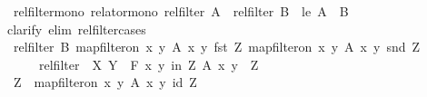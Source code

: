 \begin{isabellebody}
\isanewline
{}\isamarkupfalse%
%
\endisatagproof
{\isafoldproof}%
%
\isadelimproof
\isanewline
%
\endisadelimproof
\isanewline
{}\isamarkupfalse%
\ rel{\isacharunderscore}{\kern0pt}filter{\isacharunderscore}{\kern0pt}mono\ {\isacharbrackleft}{\kern0pt}relator{\isacharunderscore}{\kern0pt}mono{\isacharbrackright}{\kern0pt}{\isacharcolon}{\kern0pt}\ {\isachardoublequoteopen}rel{\isacharunderscore}{\kern0pt}filter\ A\ {\isasymle}\ rel{\isacharunderscore}{\kern0pt}filter\ B{\isachardoublequoteclose}\ \ le{\isacharcolon}{\kern0pt}\ {\isachardoublequoteopen}A\ {\isasymle}\ B{\isachardoublequoteclose}\isanewline
%
\isadelimproof
%
\endisadelimproof
%
\isatagproof
{}\isamarkupfalse%
{\isacharparenleft}{\kern0pt}clarify\ elim{\isacharbang}{\kern0pt}{\isacharcolon}{\kern0pt}\ rel{\isacharunderscore}{\kern0pt}filter{\isachardot}{\kern0pt}cases{\isacharparenright}{\kern0pt}\isanewline
\ \ \isamarkupfalse%
\ {\isachardoublequoteopen}rel{\isacharunderscore}{\kern0pt}filter\ B\ {\isacharparenleft}{\kern0pt}map{\isacharunderscore}{\kern0pt}filter{\isacharunderscore}{\kern0pt}on\ {\isacharbraceleft}{\kern0pt}{\isacharparenleft}{\kern0pt}x{\isacharcomma}{\kern0pt}\ y{\isacharparenright}{\kern0pt}{\isachardot}{\kern0pt}\ A\ x\ y{\isacharbraceright}{\kern0pt}\ fst\ Z{\isacharparenright}{\kern0pt}\ {\isacharparenleft}{\kern0pt}map{\isacharunderscore}{\kern0pt}filter{\isacharunderscore}{\kern0pt}on\ {\isacharbraceleft}{\kern0pt}{\isacharparenleft}{\kern0pt}x{\isacharcomma}{\kern0pt}\ y{\isacharparenright}{\kern0pt}{\isachardot}{\kern0pt}\ A\ x\ y{\isacharbraceright}{\kern0pt}\ snd\ Z{\isacharparenright}{\kern0pt}{\isachardoublequoteclose}\isanewline
\ \ \ \ {\isacharparenleft}{\kern0pt}\ {\isachardoublequoteopen}rel{\isacharunderscore}{\kern0pt}filter\ {\isacharunderscore}{\kern0pt}\ {\isacharquery}{\kern0pt}X\ {\isacharquery}{\kern0pt}Y{\isachardoublequoteclose}{\isacharparenright}{\kern0pt}\ \ {\isachardoublequoteopen}{\isasymforall}\isactrlsub F\ {\isacharparenleft}{\kern0pt}x{\isacharcomma}{\kern0pt}\ y{\isacharparenright}{\kern0pt}\ in\ Z{\isachardot}{\kern0pt}\ A\ x\ y{\isachardoublequoteclose}\ \ Z\isanewline
\ \ \isamarkupfalse%
\isanewline
\ \ \ \ \isamarkupfalse%
\ {\isacharquery}{\kern0pt}Z\ {\isacharequal}{\kern0pt}\ {\isachardoublequoteopen}map{\isacharunderscore}{\kern0pt}filter{\isacharunderscore}{\kern0pt}on\ {\isacharbraceleft}{\kern0pt}{\isacharparenleft}{\kern0pt}x{\isacharcomma}{\kern0pt}\ y{\isacharparenright}{\kern0pt}{\isachardot}{\kern0pt}\ A\ x\ y{\isacharbraceright}{\kern0pt}\ id\ Z{\isachardoublequoteclose}\isanewline

\end{isabellebody}
